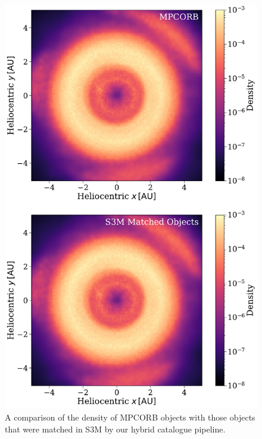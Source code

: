 \documentclass[twocolumn, twocolappendix]{aastex631}
\newcommand{\sss}{S3M}
\newcommand{\mpco}{MPCORB}
\begin{document}
\begin{figure}[htb]
    \centering
    \includegraphics[width=\columnwidth]{density_comparisons.pdf}
    \caption{A comparison of the density of \mpco{} objects with those objects that were matched in \sss{} by our hybrid catalogue pipeline.}
    \label{fig:density_compare}
\end{figure}
\end{document}
